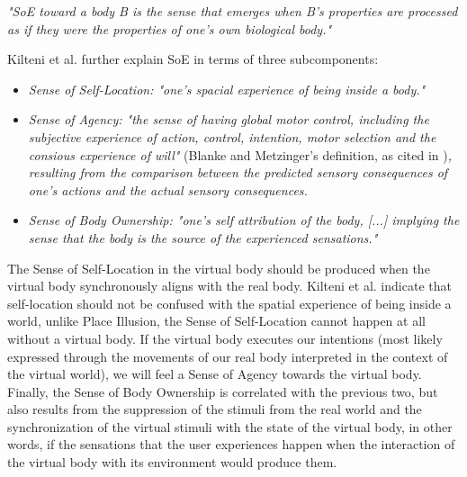\begin{displayquote}
\textit{"SoE toward a body B is the sense that emerges when B's properties are processed as if they were the properties of one's own biological body."}
\end{displayquote}

Kilteni et al. further explain SoE in terms of three subcomponents:

\begin{displayquote}
\begin{itemize}
\item \textit{Sense of Self-Location: "one's spacial experience of being inside a body."}
\item \textit{Sense of Agency: "the sense of having global motor control, including the subjective experience of action, control, intention, motor selection and the consious experience of will"} (Blanke and Metzinger's definition, as cited in \parencite{Kilteni2012})\textit{, resulting from the comparison between the predicted sensory consequences of one's actions and the actual sensory consequences.}
\item \textit{Sense of Body Ownership: "one's self attribution of the body, [...] implying the sense that the body is the source of the experienced sensations."}
\end{itemize}
\end{displayquote}

The Sense of Self-Location in the virtual body should be produced when the virtual body synchronously aligns with the real body. Kilteni et al. indicate that self-location should not be confused with the spatial experience of being inside a world, unlike Place Illusion, the Sense of Self-Location cannot happen at all without a virtual body. If the virtual body executes our intentions (most likely expressed through the movements of our real body interpreted in the context of the virtual world), we will feel a Sense of Agency towards the virtual body. Finally, the Sense of Body Ownership is correlated with the previous two, but also results from the suppression of the stimuli from the real world \parencite{Schubert1999} and the synchronization of the virtual stimuli with the state of the virtual body, in other words, if the sensations that the user experiences happen when the interaction of the virtual body with its environment would produce them.

